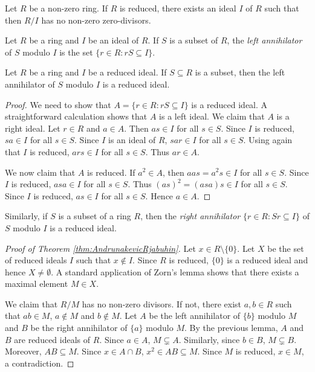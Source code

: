  \begin{theorem}
 \label{thm:AndrunakevicRjabuhin}
 	Let $R$ be a non-zero ring. If $R$ is reduced, there exists
 	an ideal $I$ of $R$ such that 
 	then $R/I$ has no non-zero zero-divisors. 
 \end{theorem}

 Let $R$ be a ring and $I$ be an ideal of $R$. If $S$ 
 is a subset of $R$, the \emph{left annihilator} of $S$
 modulo $I$ is the set $\{r\in R:rS\subseteq I\}$.  

 \begin{lemma}
    Let $R$ be a ring and $I$ be a reduced ideal. 
    If $S\subseteq R$ is a subset, then 
    the left annihilator of $S$ modulo $I$ 
    is a reduced ideal. 
 \end{lemma}

\begin{proof}
    We need to show that $A=\{r\in R:rS\subseteq I\}$ 
    is a reduced ideal. 
    A straightforward calculation shows that $A$ is 
    a left ideal. We claim that $A$ is a right ideal. Let $r\in R$
    and $a\in A$. Then 
    $as\in I$ for all $s\in S$. Since $I$ is reduced, $sa\in I$ for all $s\in S$. Since 
    $I$ is an ideal of $R$, $sar\in I$
    for all $s\in S$. Using again 
    that $I$ is reduced, 
    $ars\in I$ for all $s\in S$. Thus 
    $ar\in A$. 
    
    We now claim that $A$ is reduced. If $a^2\in A$, then 
    $aas=a^2s\in I$ for all $s\in S$. 
    Since $I$ is reduced, $asa\in I$ for
    all $s\in S$. Thus $(as)^2=(asa)s\in I$ for all $s\in S$. 
    Since $I$ is reduced, $as\in I$ for all $s\in S$. Hence $a\in A$. 
\end{proof}

Similarly, if $S$ is a subset of a ring $R$, then 
the \emph{right annihilator} 
$\{r\in R:Sr\subseteq I\}$ 
of $S$ modulo $I$ 
is a reduced ideal. 

\begin{proof}[Proof of Theorem \ref{thm:AndrunakevicRjabuhin}]
    Let $x\in R\setminus\{0\}$. Let $X$ 
    be the set of reduced ideals $I$ such that 
    $x\not\in I$. Since $R$ is reduced, $\{0\}$ 
    is a reduced ideal and hence $X\ne\emptyset$. 
    A standard application of Zorn's lemma shows that
    there exists a maximal element $M\in X$. 
    
    We claim that $R/M$ has no non-zero divisors. If not, 
    there exist $a,b\in R$ such that $ab\in M$, $a\not\in M$ 
    and $b\not\in M$. Let $A$ be the left annihilator of $\{b\}$ 
    modulo $M$ and $B$ be the right annihilator of $\{a\}$ 
    modulo $M$. By the previous lemma, $A$ and $B$ 
    are reduced ideals of $R$. Since  
    $a\in A$, $M\subsetneq A$. Similarly, since 
    $b\in B$, $M\subsetneq B$. Moreover, $AB\subseteq M$. 
    Since $x\in A\cap B$, $x^2\in AB\subseteq M$. Since 
    $M$ is reduced, $x\in M$, a contradiction. 
\end{proof}

